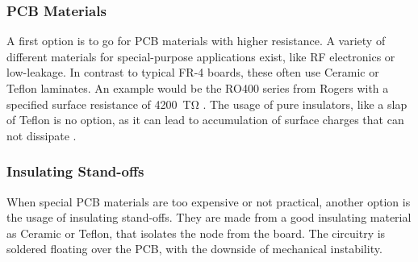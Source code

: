 \subsubsection*{PCB Materials}
A first option is to go for PCB materials with higher resistance. A variety of different materials for special-purpose applications exist, like RF electronics or low-leakage. In contrast to typical FR-4 boards, these often use Ceramic or Teflon laminates. An example would be the RO400 series from Rogers with a specified surface resistance of \SI{4200}{\tera\ohm} \cite{rogers}. The usage of pure insulators, like a slap of Teflon is no option, as it can lead to accumulation of surface charges that can not dissipate \cite{EDN}.
\subsubsection*{Insulating Stand-offs}
When special PCB materials are too expensive or not practical, another option is the usage of insulating stand-offs. They are made from a good insulating material as Ceramic or Teflon, that isolates the node from the board. The circuitry is soldered floating over the PCB, with the downside of mechanical instability.
